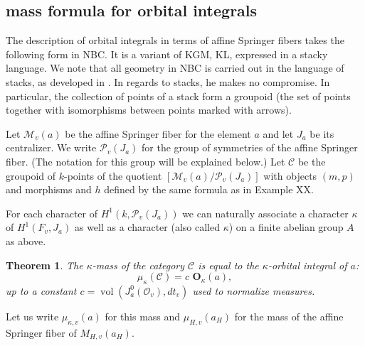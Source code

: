 \documentclass[brochure,english,12pt]{bourbaki}
\newtheorem{example}[equation]{Example}
\newtheorem{theorem}[equation]{Theorem}
\def\op#1{{\operatorname{#1}}}
\def\OO{{\mathbf O}}
\def\C{{\mathcal C}}
\def\M{{\mathcal M}}
\def\P{{\mathcal P}}
\def\O{{\mathcal O}}
\begin{document}


\subsection{mass formula for orbital integrals}

The description of orbital integrals in terms of affine Springer
fibers takes the following form in NBC.  It is a variant of KGM, KL,
expressed in a stacky language.  We note that all geometry in NBC is
carried out in the language of stacks, as developed in
\cite{Laumon-MB}.  In regards to stacks, he makes no compromise.  In
particular, the collection of points of a stack form a groupoid (the
set of points together with isomorphisms between points marked with
arrows).

Let $\M_v(a)$ be the affine Springer fiber for the element $a$ and let
$J_a$ be its centralizer.  We write $\P_v(J_a)$ for the group of
symmetries of the affine Springer fiber.  (The notation for this group
will be explained below.)  Let $\C$ be the groupoid of $k$-points of
the quotient $[\M_v(a)/\P_v(J_a)]$ with objects $(m,p)$ and morphisms
and $h$ defined by the same formula as in Example XX.

For each character of $H^1(k,\P_v(J_a))$ we can naturally associate a
character $\kappa$ of $H^1(F_v,J_a)$ as well as a character (also
called $\kappa$) on a finite abelian group $A$ as above.

\begin{theorem}
The $\kappa$-mass of the category $\C$ is equal to the
$\kappa$-orbital integral of $a$:
\[
\mu_\kappa(\C) = c\,\, \OO_\kappa(a),
\]
up to a constant $c=\op{vol}(J^0_a(\O_v),dt_v)$ used to normalize measures.
\end{theorem}


Let us write $\mu_{\kappa,v}(a)$ for this mass and $\mu_{H,v}(a_H)$
for the mass of the affine Springer fiber of $M_{H,v}(a_H)$.
\end{document}

